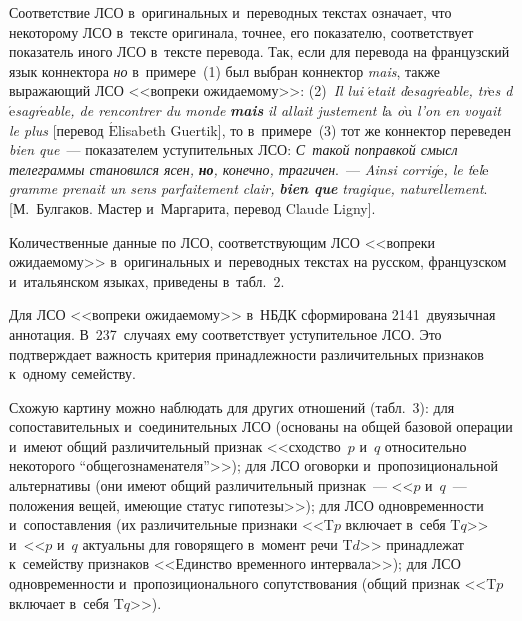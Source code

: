 \begin{multicols}{2}
  Соответствие ЛСО в~оригинальных и~переводных текстах означает, что 
некоторому ЛСО в~тексте оригинала, точнее, его показателю, соответствует 
показатель иного ЛСО в~тексте перевода. Так, если для перевода на 
французский язык коннектора \textit{но} в~примере~(1) был выбран коннектор 
\textit{mais}, также выражающий ЛСО <<вопреки ожидаемому>>: (2)~\textit{Il 
lui $\acute{\mbox{e}}$tait d$\acute{\mbox{e}}$sagr$\acute{\mbox{e}}$able, 
tr$\grave{\mbox{e}}$s d$\acute{\mbox{e}}$sagr$\acute{\mbox{e}}$able, de 
rencontrer du monde} {\bfseries\textit{mais}} \textit{il allait justement 
l$\grave{\mbox{a}}$ o$\grave{\mbox{u}}$ l'on en voyait le plus} [перевод 
$\acute{\mbox{E}}$lisabeth Guertik], то в~примере~(3) тот же коннектор 
переведен \textit{bien que}~--- показателем уступительных ЛСО: 
\textit{С~такой поправкой смысл телеграммы становился ясен,} 
{\bfseries\textit{но}}\textit{, конечно, трагичен}.~--- \textit{Ainsi 
corrig$\acute{\mbox{e}}$, le t$\acute{\mbox{e}}$l$\acute{\mbox{e}}$gramme 
prenait un sens parfaitement clair,} {\bfseries\textit{bien que}} \textit{tragique, 
naturellement}. [М.~Булгаков. Мастер и~Маргарита, перевод Claude Ligny].
  
  Количественные данные по ЛСО, соответствующим ЛСО <<вопреки 
ожидаемому>> в~оригинальных и~переводных текстах на русском, французском и~итальянском языках, приведены в~табл.~2.
  
  
  Для ЛСО <<вопреки ожидаемому>> в~НБДК сформирована 2141~двуязычная 
аннотация. В~237~случаях ему соответствует уступительное ЛСО. Это 
подтверждает важность критерия принадлежности \mbox{различительных} признаков к~одному семейству. 

Схожую картину можно наблюдать для других отношений 
(табл.~3): для сопоставительных и~соединительных ЛСО (основаны на 
общей базовой операции и~имеют общий различительный признак 
<<сходство~$p$ и~$q$ относительно некоторого ``общего\linebreak знаменателя''>>); для 
ЛСО оговорки и~пропозициональной альтернативы (они имеют общий 
различительный признак~--- <<$p$ и~$q$~--- положения вещей, име\-ющие 
статус гипотезы>>); для ЛСО \mbox{одновременности} и~со\-по\-став\-ле\-ния (их 
различительные при\-зна\-ки <<T$p$ включает в~себя T$q$>> и~<<$p$ и~$q$ 
актуальны для говорящего в~момент речи T$d$>> принадлежат к~семейству 
признаков <<Единство временного интервала>>); для ЛСО одновременности 
и~пропозиционального сопутствования (об\-щий признак <<T$p$ включает 
в~себя T$q$>>). 
  
\begin{table*}\small %
\begin{center}
\vspace*{2ex}


\end{center}
\end{table*}
\end{multicols}
